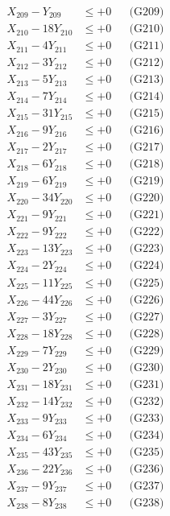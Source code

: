 \documentclass[a4paper,10pt]{article}
\begin{document}
{\begin{align}
X_{209} - Y_{209} &\leq +0 && \text{(G209)} \\
X_{210} - 18Y_{210} &\leq +0 && \text{(G210)} \\
X_{211} - 4Y_{211} &\leq +0 && \text{(G211)} \\
X_{212} - 3Y_{212} &\leq +0 && \text{(G212)} \\
X_{213} - 5Y_{213} &\leq +0 && \text{(G213)} \\
\allowbreak
X_{214} - 7Y_{214} &\leq +0 && \text{(G214)} \\
X_{215} - 31Y_{215} &\leq +0 && \text{(G215)} \\
X_{216} - 9Y_{216} &\leq +0 && \text{(G216)} \\
X_{217} - 2Y_{217} &\leq +0 && \text{(G217)} \\
X_{218} - 6Y_{218} &\leq +0 && \text{(G218)} \\
X_{219} - 6Y_{219} &\leq +0 && \text{(G219)} \\
X_{220} - 34Y_{220} &\leq +0 && \text{(G220)} \\
X_{221} - 9Y_{221} &\leq +0 && \text{(G221)} \\
X_{222} - 9Y_{222} &\leq +0 && \text{(G222)} \\
X_{223} - 13Y_{223} &\leq +0 && \text{(G223)} \\
\allowbreak
X_{224} - 2Y_{224} &\leq +0 && \text{(G224)} \\
X_{225} - 11Y_{225} &\leq +0 && \text{(G225)} \\
X_{226} - 44Y_{226} &\leq +0 && \text{(G226)} \\
X_{227} - 3Y_{227} &\leq +0 && \text{(G227)} \\
X_{228} - 18Y_{228} &\leq +0 && \text{(G228)} \\
X_{229} - 7Y_{229} &\leq +0 && \text{(G229)} \\
X_{230} - 2Y_{230} &\leq +0 && \text{(G230)} \\
X_{231} - 18Y_{231} &\leq +0 && \text{(G231)} \\
X_{232} - 14Y_{232} &\leq +0 && \text{(G232)} \\
X_{233} - 9Y_{233} &\leq +0 && \text{(G233)} \\
\allowbreak
X_{234} - 6Y_{234} &\leq +0 && \text{(G234)} \\
X_{235} - 43Y_{235} &\leq +0 && \text{(G235)} \\
X_{236} - 22Y_{236} &\leq +0 && \text{(G236)} \\
X_{237} - 9Y_{237} &\leq +0 && \text{(G237)} \\
X_{238} - 8Y_{238} &\leq +0 && \text{(G238)} \\

\end{align}}
\end{document}
